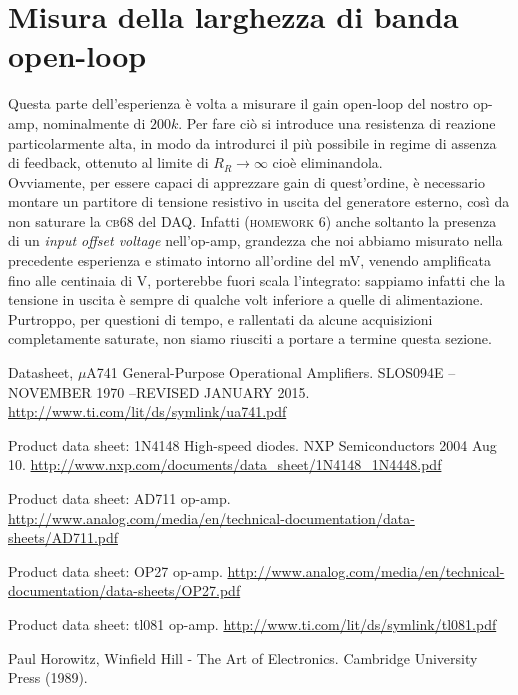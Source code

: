 \documentclass[journal, a4paper]{IEEEtran}
\begin{document}
\section{Misura della larghezza di banda open-loop}

Questa parte dell'esperienza è volta a misurare il gain open-loop del nostro op-amp, nominalmente di $200k$. Per fare ciò si introduce una resistenza di reazione particolarmente alta, in modo da introdurci il più possibile in regime di assenza di feedback, ottenuto al limite di $R_R \rightarrow \infty $  cioè eliminandola.\\
Ovviamente, per essere capaci di apprezzare gain di quest'ordine, è necessario montare un partitore di tensione resistivo in uscita del generatore esterno, così da non saturare la \textsc{cb68} del DAQ. Infatti (\textsc{homework 6}) anche soltanto la presenza di un \textit{input offset voltage} nell'op-amp, grandezza che noi abbiamo misurato nella precedente esperienza e stimato intorno all'ordine del \si{mV}, venendo amplificata fino alle centinaia di \si{V}, porterebbe fuori scala l'integrato: sappiamo infatti che la tensione in uscita è sempre di qualche volt inferiore a quelle di alimentazione.\\


Purtroppo, per questioni di tempo, e rallentati da alcune acquisizioni completamente saturate, non siamo riusciti a portare a termine questa sezione.



\begin{thebibliography}{5}

	Datasheet, $\mu $A741 General-Purpose Operational Amplifiers. SLOS094E – NOVEMBER 1970  –REVISED JANUARY 2015.
	\url{http://www.ti.com/lit/ds/symlink/ua741.pdf}

	Product data sheet: 1N4148 High-speed diodes. NXP Semiconductors 2004 Aug 10.
	\url{http://www.nxp.com/documents/data_sheet/1N4148_1N4448.pdf}

	Product data sheet: AD711 op-amp.
	\url{http://www.analog.com/media/en/technical-documentation/data-sheets/AD711.pdf}
	
	Product data sheet: OP27 op-amp.
	\url{http://www.analog.com/media/en/technical-documentation/data-sheets/OP27.pdf}
	
	Product data sheet: tl081 op-amp.
	\url{http://www.ti.com/lit/ds/symlink/tl081.pdf}

	Paul Horowitz, Winfield Hill - The Art of Electronics. Cambridge University Press (1989).
	
\end{thebibliography}

\end{document}
